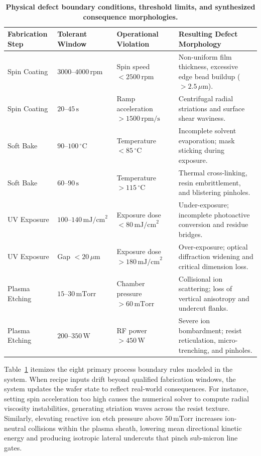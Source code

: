 \documentclass[10pt,a4paper,twocolumn]{article}
\begin{document}
\begin{table}[!t]
\centering
\caption{\textbf{Physical defect boundary conditions, threshold limits, and synthesized consequence morphologies.}}
\label{table:defect_matrix}
\small
\begin{tabularx}{\textwidth}{p{2.6cm}p{2.6cm}p{3.8cm}X}
\toprule
\textbf{Fabrication Step} & \textbf{Tolerant Window} & \textbf{Operational Violation} & \textbf{Resulting Defect Morphology} \\
\midrule
Spin Coating & $3000\text{--}4000\,\text{rpm}$ & Spin speed $<2500\,\text{rpm}$ & Non-uniform film thickness, excessive edge bead buildup ($>2.5\,\mu\text{m}$). \\
Spin Coating & $20\text{--}45\,\text{s}$ & Ramp acceleration $>1500\,\text{rpm/s}$ & Centrifugal radial striations and surface shear waviness. \\
Soft Bake & $90\text{--}100\,^\circ\text{C}$ & Temperature $<85\,^\circ\text{C}$ & Incomplete solvent evaporation; mask sticking during exposure. \\
Soft Bake & $60\text{--}90\,\text{s}$ & Temperature $>115\,^\circ\text{C}$ & Thermal cross-linking, resin embrittlement, and blistering pinholes. \\
UV Exposure & $100\text{--}140\,\text{mJ/cm}^2$ & Exposure dose $<80\,\text{mJ/cm}^2$ & Under-exposure; incomplete photoactive conversion and residue bridges. \\
UV Exposure & Gap $<20\,\mu\text{m}$ & Exposure dose $>180\,\text{mJ/cm}^2$ & Over-exposure; optical diffraction widening and critical dimension loss. \\
Plasma Etching & $15\text{--}30\,\text{mTorr}$ & Chamber pressure $>60\,\text{mTorr}$ & Collisional ion scattering; loss of vertical anisotropy and undercut flanks. \\
Plasma Etching & $200\text{--}350\,\text{W}$ & RF power $>450\,\text{W}$ & Severe ion bombardment; resist reticulation, micro-trenching, and pinholes. \\
\bottomrule
\end{tabularx}
\end{table}

Table~\ref{table:defect_matrix} itemizes the eight primary process boundary rules modeled in the system. When recipe inputs drift beyond qualified fabrication windows, the system updates the wafer state to reflect real-world consequences. For instance, setting spin acceleration too high causes the numerical solver to compute radial viscosity instabilities, generating striation waves across the resist texture. Similarly, elevating reactive ion etch pressure above $50\,\text{mTorr}$ increases ion-neutral collisions within the plasma sheath, lowering mean directional kinetic energy and producing isotropic lateral undercuts that pinch sub-micron line gates.
\end{document}
